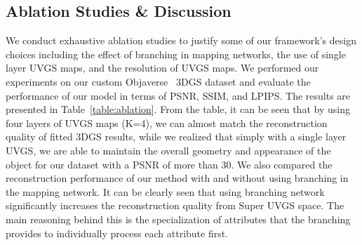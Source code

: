 





\subsection{Ablation Studies \& Discussion}

We conduct exhaustive ablation studies to justify some of our framework's design choices including the effect of branching in mapping networks, the use of single layer UVGS maps, and the resolution of UVGS maps. We performed our experiments on our custom Objaverse~\cite{objaverse2023} 3DGS dataset and evaluate the performance of our model in terms of PSNR, SSIM, and LPIPS. The results are presented in Table~\ref{table:ablation}. From the table, it can be seen that by using four layers of UVGS maps (K=4), we can almost match the reconstruction quality of fitted 3DGS results, while we realized that simply with a single layer UVGS, we are able to maintain the overall geometry and appearance of the object for our dataset with a PSNR of more than 30. 
We also compared the reconstruction performance of our method with and without using branching in the mapping network. It can be clearly seen that using branching network significantly increases the reconstruction quality from Super UVGS space. The main reasoning behind this is the specialization of attributes that the branching provides to individually process each attribute first.

\vspace{0.2cm}

